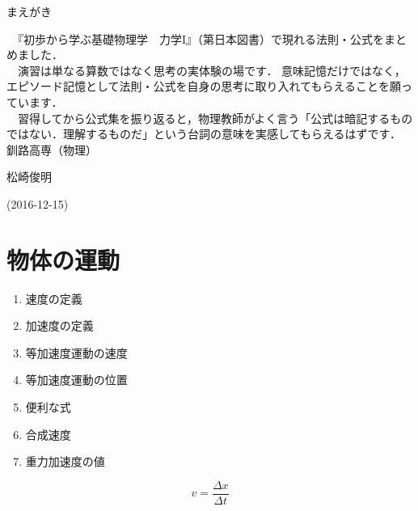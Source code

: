 \documentclass[10pt]{jarticle}
\begin{document}
\addtocounter{page}{-1}
\thispagestyle{empty}

まえがき\\

{\scriptsize
　『初歩から学ぶ基礎物理学　力学I』（第日本図書）で現れる法則・公式をまとめました．\\

　演習は単なる算数ではなく思考の実体験の場です．
意味記憶だけではなく，エピソード記憶として法則・公式を自身の思考に取り入れてもらえることを願っています．\\

　習得してから公式集を振り返ると，物理教師がよく言う「公式は暗記するものではない．理解するものだ」という台詞の意味を実感してもらえるはずです．\\




\hfill
釧路高専（物理）

\hfill
松崎俊明

\vfill
\hfill
(2016-12-15)
}

\newpage
\addtocounter{page}{-1}
\thispagestyle{empty}
\tableofcontents



\newpage
\addtocounter{page}{-1}
\thispagestyle{empty}
\section{物体の運動}


\begin{enumerate}
\small
\itemsep-4mm
\item 速度の定義\\
\item 加速度の定義\\
\item 等加速度運動の速度\\
\item 等加速度運動の位置\\
\item 便利な式\\
\item 合成速度\\
\item 重力加速度の値
\end{enumerate}


\newpage
\[
	v = \frac{\mathit{\Delta} x}{\mathit{\Delta} t}
\]
\end{document}
